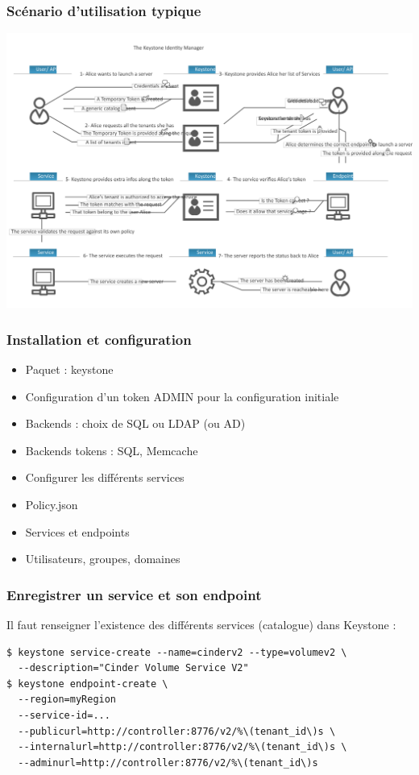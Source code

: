   \begin{frame}
    \frametitle{Scénario d'utilisation typique}
    \includegraphics[width=\linewidth]{images/keystone-scenario.png}
  \end{frame}

  \begin{frame}
    \frametitle{Installation et configuration}
    \begin{itemize}
      \item Paquet : keystone
      \item Configuration d'un token ADMIN pour la configuration initiale
      \item Backends : choix de SQL ou LDAP (ou AD)
      \item Backends tokens : SQL, Memcache
      \item Configurer les différents services
      \item Policy.json
      \item Services et endpoints
      \item Utilisateurs, groupes, domaines
    \end{itemize}
  \end{frame}

  \begin{frame}[containsverbatim]
    \frametitle{Enregistrer un service et son endpoint}
    Il faut renseigner l'existence des différents services (catalogue) dans Keystone :
    \begin{verbatim}
$ keystone service-create --name=cinderv2 --type=volumev2 \
  --description="Cinder Volume Service V2"
$ keystone endpoint-create \
  --region=myRegion
  --service-id=...
  --publicurl=http://controller:8776/v2/%\(tenant_id\)s \
  --internalurl=http://controller:8776/v2/%\(tenant_id\)s \
  --adminurl=http://controller:8776/v2/%\(tenant_id\)s
    \end{verbatim}
  \end{frame}


